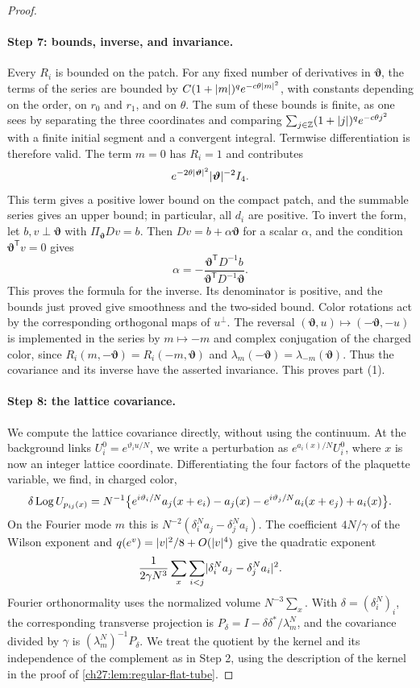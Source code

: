\begin{proof}
\paragraph{Step 7: bounds, inverse, and invariance.}
Every $R_i$ is bounded on the patch. For any fixed number of derivatives in $\bm\vartheta$, the terms of the series are bounded by $C(1+\lvert m\rvert)^qe^{-c\theta\lvert m\rvert^2}$, with constants depending on the order, on $r_0$ and $r_1$, and on $\theta$. The sum of these bounds is finite, as one sees by separating the three coordinates and comparing $\sum_{j\in\mathbb Z}(1+\lvert j\rvert)^qe^{-c\theta j^2}$ with a finite initial segment and a convergent integral. Termwise differentiation is therefore valid. The term $m=0$ has $R_i=1$ and contributes
\[
 e^{-2\theta\lvert \bm\vartheta\rvert^2}\lvert \bm\vartheta\rvert^{-2}I_4.
\]
This term gives a positive lower bound on the compact patch, and the summable series gives an upper bound; in particular, all $d_i$ are positive. To invert the form, let $b,v\perp\bm\vartheta$ with $\Pi_{\bm\vartheta}Dv=b$. Then $Dv=b+\alpha\bm\vartheta$ for a scalar $\alpha$, and the condition $\bm\vartheta^{\mathsf T}v=0$ gives
\[
 \alpha=-\frac{\bm\vartheta^{\mathsf T}D^{-1}b}{\bm\vartheta^{\mathsf T}D^{-1}\bm\vartheta}.
\]
This proves the formula for the inverse. Its denominator is positive, and the bounds just proved give smoothness and the two-sided bound. Color rotations act by the corresponding orthogonal maps of $u^\perp$. The reversal $(\bm\vartheta,u)\mapsto(-\bm\vartheta,-u)$ is implemented in the series by $m\mapsto-m$ and complex conjugation of the charged color, since $R_i(m,-\bm\vartheta)=R_i(-m,\bm\vartheta)$ and $\lambda_m(-\bm\vartheta)=\lambda_{-m}(\bm\vartheta)$. Thus the covariance and its inverse have the asserted invariance. This proves part (1).

\paragraph{Step 8: the lattice covariance.}
We compute the lattice covariance directly, without using the continuum. At the background links $U_i^0=e^{\vartheta_iu/N}$, we write a perturbation as $e^{a_i(x)/N}U_i^0$, where $x$ is now an integer lattice coordinate. Differentiating the four factors of the plaquette variable, we find, in charged color,
\[
 \delta\operatorname{Log} U_{p_{ij}(x)}=N^{-1}\bigl\{e^{i\vartheta_i/N}a_j(x+e_i)-a_j(x)-e^{i\vartheta_j/N}a_i(x+e_j)+a_i(x)\bigr\}.
\]
On the Fourier mode $m$ this is $N^{-2}(\delta_i^Na_j-\delta_j^Na_i)$. The coefficient $4N/\gamma$ of the Wilson exponent and $q(e^v)=\lvert v\rvert^2/8+O(\lvert v\rvert^4)$ give the quadratic exponent
\begin{equation}\label{ch27:eq:lattice-maxwell-exponent}
 \frac1{2\gamma N^3}\sum_x\sum_{i<j}\lvert \delta_i^Na_j-\delta_j^Na_i\rvert^2.
\end{equation}
Fourier orthonormality uses the normalized volume $N^{-3}\sum_x$. With $\delta=(\delta_i^N)_i$, the corresponding transverse projection is $P_\delta=I-\delta\delta^*/\lambda_m^N$, and the covariance divided by $\gamma$ is $(\lambda_m^N)^{-1}P_\delta$. We treat the quotient by the kernel and its independence of the complement as in Step 2, using the description of the kernel in the proof of \cref{ch27:lem:regular-flat-tube}.


\end{proof}
